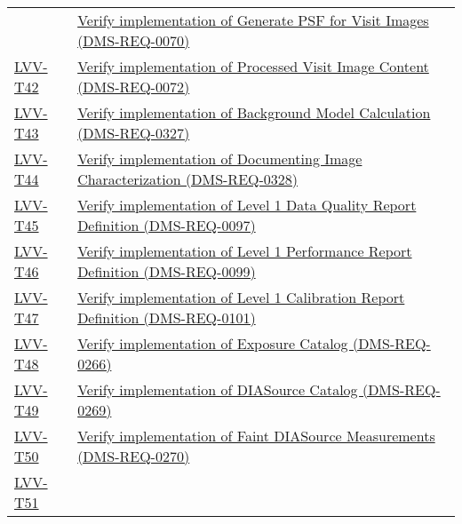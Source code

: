 \begin{longtable}[]{p{3cm}p{13cm}}
&
\href{https://jira.lsstcorp.org/secure/Tests.jspa\#/testCase/LVV-T41}{Verify
implementation of Generate PSF for Visit Images
(DMS-REQ-0070)}\tabularnewline
\protect\hyperlink{lvv-t42---verify-implementation-of-processed-visit-image-content-dms-req-0072}{LVV-T42}
&
\href{https://jira.lsstcorp.org/secure/Tests.jspa\#/testCase/LVV-T42}{Verify
implementation of Processed Visit Image Content
(DMS-REQ-0072)}\tabularnewline
\protect\hyperlink{lvv-t43---verify-implementation-of-background-model-calculation-dms-req-0327}{LVV-T43}
&
\href{https://jira.lsstcorp.org/secure/Tests.jspa\#/testCase/LVV-T43}{Verify
implementation of Background Model Calculation
(DMS-REQ-0327)}\tabularnewline
\protect\hyperlink{lvv-t44---verify-implementation-of--documenting-image-characterization-dms-req-0328}{LVV-T44}
&
\href{https://jira.lsstcorp.org/secure/Tests.jspa\#/testCase/LVV-T44}{Verify
implementation of Documenting Image Characterization
(DMS-REQ-0328)}\tabularnewline
\protect\hyperlink{lvv-t45---verify-implementation-of-level-1-data-quality-report-definition-dms-req-0097}{LVV-T45}
&
\href{https://jira.lsstcorp.org/secure/Tests.jspa\#/testCase/LVV-T45}{Verify
implementation of Level 1 Data Quality Report Definition
(DMS-REQ-0097)}\tabularnewline
\protect\hyperlink{lvv-t46---verify-implementation-of-level-1-performance-report-definition-dms-req-0099}{LVV-T46}
&
\href{https://jira.lsstcorp.org/secure/Tests.jspa\#/testCase/LVV-T46}{Verify
implementation of Level 1 Performance Report Definition
(DMS-REQ-0099)}\tabularnewline
\protect\hyperlink{lvv-t47---verify--implementation-of-level-1-calibration-report-definition-dms-req-0101}{LVV-T47}
&
\href{https://jira.lsstcorp.org/secure/Tests.jspa\#/testCase/LVV-T47}{Verify
implementation of Level 1 Calibration Report Definition
(DMS-REQ-0101)}\tabularnewline
\protect\hyperlink{lvv-t48---verify-implementation-of-exposure-catalog-dms-req-0266}{LVV-T48}
&
\href{https://jira.lsstcorp.org/secure/Tests.jspa\#/testCase/LVV-T48}{Verify
implementation of Exposure Catalog (DMS-REQ-0266)}\tabularnewline
\protect\hyperlink{lvv-t49---verify-implementation-of-diasource-catalog-dms-req-0269}{LVV-T49}
&
\href{https://jira.lsstcorp.org/secure/Tests.jspa\#/testCase/LVV-T49}{Verify
implementation of DIASource Catalog (DMS-REQ-0269)}\tabularnewline
\protect\hyperlink{lvv-t50---verify-implementation-of-faint-diasource-measurements-dms-req-0270}{LVV-T50}
&
\href{https://jira.lsstcorp.org/secure/Tests.jspa\#/testCase/LVV-T50}{Verify
implementation of Faint DIASource Measurements
(DMS-REQ-0270)}\tabularnewline
\protect\hyperlink{lvv-t51---verify-implementation-of-diaobject-catalog-dms-req-0271}{LVV-T51}

\end{longtable}
